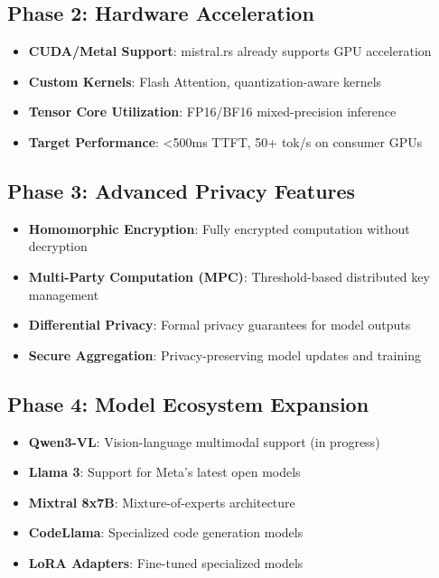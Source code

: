 \documentclass[11pt,a4paper]{article}
\begin{document}
\subsection{Phase 2: Hardware Acceleration}

\begin{itemize}
    \item \textbf{CUDA/Metal Support}: mistral.rs already supports GPU acceleration
    \item \textbf{Custom Kernels}: Flash Attention, quantization-aware kernels
    \item \textbf{Tensor Core Utilization}: FP16/BF16 mixed-precision inference
    \item \textbf{Target Performance}: <500ms TTFT, 50+ tok/s on consumer GPUs
\end{itemize}

\subsection{Phase 3: Advanced Privacy Features}

\begin{itemize}
    \item \textbf{Homomorphic Encryption}: Fully encrypted computation without decryption
    \item \textbf{Multi-Party Computation (MPC)}: Threshold-based distributed key management
    \item \textbf{Differential Privacy}: Formal privacy guarantees for model outputs
    \item \textbf{Secure Aggregation}: Privacy-preserving model updates and training
\end{itemize}

\subsection{Phase 4: Model Ecosystem Expansion}

\begin{itemize}
    \item \textbf{Qwen3-VL}: Vision-language multimodal support (in progress)
    \item \textbf{Llama 3}: Support for Meta's latest open models
    \item \textbf{Mixtral 8x7B}: Mixture-of-experts architecture
    \item \textbf{CodeLlama}: Specialized code generation models
    \item \textbf{LoRA Adapters}: Fine-tuned specialized models
\end{itemize}
\end{document}
